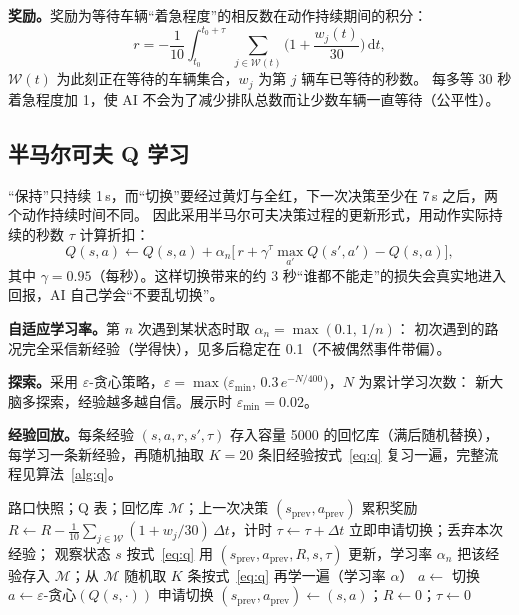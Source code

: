 \documentclass[UTF8,a4paper,zihao=-4,fontset=none]{ctexart}
\begin{document}
\textbf{奖励。}奖励为等待车辆“着急程度”的相反数在动作持续期间的积分：
\begin{equation}
  r = -\frac{1}{10}\int_{t_0}^{t_0+\tau}\;\sum_{j\in\mathcal{W}(t)}\Big(1+\frac{w_j(t)}{30}\Big)\,\mathrm{d}t ,
\end{equation}
$\mathcal{W}(t)$ 为此刻正在等待的车辆集合，$w_j$ 为第 $j$ 辆车已等待的秒数。
每多等 30 秒着急程度加 1，使 AI 不会为了减少排队总数而让少数车辆一直等待（公平性）。

\subsection{半马尔可夫 Q 学习}
“保持”只持续 1\,s，而“切换”要经过黄灯与全红，下一次决策至少在 7\,s 之后，两个动作持续时间不同。
因此采用半马尔可夫决策过程的更新形式\cite{bradtke1995}，用动作实际持续的秒数 $\tau$ 计算折扣：
\begin{equation}
  Q(s,a) \leftarrow Q(s,a) + \alpha_n\Big[\, r + \gamma^{\tau}\max_{a'}Q(s',a') - Q(s,a) \Big],
  \label{eq:q}
\end{equation}
其中 $\gamma=0.95$（每秒）。这样切换带来的约 3 秒“谁都不能走”的损失会真实地进入回报，AI 自己学会“不要乱切换”。

\textbf{自适应学习率。}第 $n$ 次遇到某状态时取 $\alpha_n=\max(0.1,\,1/n)$：
初次遇到的路况完全采信新经验（学得快），见多后稳定在 0.1（不被偶然事件带偏）。

\textbf{探索。}采用 $\varepsilon$-贪心策略，$\varepsilon=\max\!\big(\varepsilon_{\min},\,0.3\,e^{-N/400}\big)$，$N$ 为累计学习次数：
新大脑多探索，经验越多越自信。展示时 $\varepsilon_{\min}=0.02$。

\textbf{经验回放。}每条经验 $(s,a,r,s',\tau)$ 存入容量 5000 的回忆库（满后随机替换），
每学习一条新经验，再随机抽取 $K=20$ 条旧经验按式~\eqref{eq:q} 复习一遍，完整流程见算法~\ref{alg:q}。

\begin{algorithm}[t]
\caption{带经验回放的半马尔可夫 Q 学习控制器（每个仿真步调用）}
\label{alg:q}
\begin{algorithmic}[1]
\Require 路口快照；Q 表；回忆库 $\mathcal{M}$；上一次决策 $(s_{\text{prev}},a_{\text{prev}})$
\State 累积奖励 $R \gets R - \frac{1}{10}\sum_{j\in\mathcal{W}}(1+w_j/30)\,\Delta t$，计时 $\tau\gets\tau+\Delta t$
 
  \State 立即申请切换；丢弃本次经验；\Return
\EndIf
{} \Return \EndIf
\State 观察状态 $s$
  \State 按式~\eqref{eq:q} 用 $(s_{\text{prev}},a_{\text{prev}},R,s,\tau)$ 更新，学习率 $\alpha_n$
  \State 把该经验存入 $\mathcal{M}$；从 $\mathcal{M}$ 随机取 $K$ 条按式~\eqref{eq:q} 再学一遍（学习率 $\alpha$）
\EndIf
{} $a\gets$ 切换 
\Else\ $a\gets\varepsilon$-贪心$(Q(s,\cdot))$
\EndIf
{} 申请切换 \EndIf
\State $(s_{\text{prev}},a_{\text{prev}})\gets(s,a)$；$R\gets0$；$\tau\gets0$
\end{algorithmic}
\end{algorithm}
\end{document}

